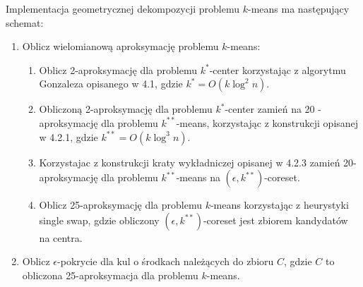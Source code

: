 \noindent
Implementacja geometrycznej dekompozycji problemu $k$-means ma następujący schemat:
\begin{enumerate}
    \item Oblicz wielomianową aproksymację problemu $k$-means:
    \begin{enumerate}
        \item Oblicz 2-aproksymację dla problemu $k^{*}$-center korzystając z algorytmu Gonzaleza opisanego w 4.1, gdzie $k^{*} = O(k \log^2 n)$.
        \item Obliczoną 2-aproksymację dla problemu $k^{*}$-center zamień na 20 - aproksymację dla problemu $k^{**}$-means, korzystając z konstrukcji opisanej w 4.2.1, gdzie $k^{**} = O(k \log^3 n)$.
        \item Korzystajac z konstrukcji kraty wykładniczej opisanej w 4.2.3 zamień 20-aproksymację dla problemu $k^{**}$-means na $(\epsilon, k^{**})$-coreset.
        \item Oblicz 25-aproksymację dla problemu $k$-means korzystając z heurystyki single swap, gdzie obliczony $(\epsilon, k^{**})$-coreset jest zbiorem kandydatów na centra.
        \end{enumerate}
    \item Oblicz $\epsilon$-pokrycie dla kul o środkach należących do zbioru $C$, gdzie $C$ to obliczona 25-aproksymacja dla problemu $k$-means.
\end{enumerate}

